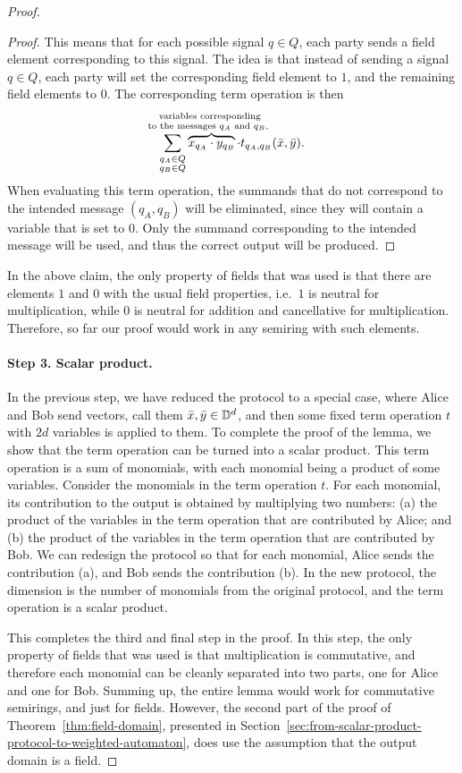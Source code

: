 \begin{proof}
\begin{proof}
    This means that for each possible signal $q \in Q$, each party sends a field element corresponding to this signal. The idea is that instead of sending a signal $q \in Q$, each party will set the corresponding field element to $1$, and the remaining field elements to $0$. The corresponding term operation is then 
    \begin{align*}
    \sum_{\substack{q_A \in Q \\ q_B \in Q}} \myoverbrace{x_{q_A} \cdot y_{q_B}}{variables corresponding \\ to the messages $q_A$ and $q_B$, } \cdot t_{q_A,q_B}(\bar x, \bar y).
    \end{align*}
    When evaluating this term operation, the summands that do not correspond to the intended message $(q_A,q_B)$ will be eliminated, since they will contain a variable that is set to $0$. Only the summand corresponding to the intended message will be used, and thus the correct output will be produced. 
 \end{proof}

 In the above claim, the only property of fields that was used is that there are elements $1$ and $0$ with the usual field properties, i.e.~$1$ is neutral for multiplication, while $0$ is neutral for addition and cancellative for multiplication. Therefore, so far our proof would work in any semiring with such elements.

 \paragraph*{Step 3. Scalar product.} In the previous step, we have reduced the protocol to a special case, where Alice and Bob send vectors, call them $\bar x, \bar y \in \mathbb D^d$, and then some fixed term operation $t$ with $2d$ variables is applied to them. 
  To complete the proof of the lemma, we show that the term operation can be turned into a scalar product. This term operation is a sum of monomials, with each monomial being a product of some variables. Consider the monomials in the term operation $t$. For each monomial, its contribution to the output  is obtained by multiplying two numbers: (a) the product of the  variables in the term operation that are contributed by Alice; and   (b) the product of the variables in the term operation that are contributed by Bob. We can redesign the protocol so that for each monomial, Alice sends the contribution (a), and Bob sends the contribution (b). In the new protocol, the dimension is the number of monomials from the original protocol, and the term operation is a scalar product. 

  This completes the third and final step in the proof. In this step, the only property of fields that was used is that multiplication is commutative, and therefore each monomial can be cleanly separated into two parts, one for Alice and one for Bob. Summing up, the entire lemma would work for commutative semirings, and just for fields. However, the second part of the proof of Theorem~\ref{thm:field-domain}, presented in Section~\ref{sec:from-scalar-product-protocol-to-weighted-automaton}, does use the assumption  that the output domain is a field.
\end{proof}

